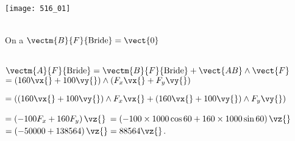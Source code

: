 \normaltrue \difficilefalse \tdifficilefalse
\correctiontrue 


\setcounter{question}{0}%
\ifcorrection
\else
{}
\fi

\ifprof
\else


\begin{marginfigure}
\centering
\texttt{[image: 516\_01]}
\end{marginfigure}
\fi


\ifprof ~\\
On a $\vectm{B}{F}{\text{Bride}} = \vect{0}$
\else
\fi

\ifprof ~\\
$\vectm{A}{F}{\text{Bride}}=\vectm{B}{F}{\text{Bride}} + \vect{AB}\wedge \vect{F} $ 
$=\left(160 \vx{} + 100 \vy{}\right) \wedge \left(F_x \vx{}+F_y \vy{} \right) $

$= \left(\left(160 \vx{} + 100 \vy{}\right) \wedge  F_x \vx{}+ \left(160 \vx{} + 100 \vy{}\right) \wedge F_y \vy{} \right) $

$= \left( -100 F_x +  160  F_y   \right)\vz{} $
$= \left( -100 \times 1000 \cos 60 +  160   \times 1000 \sin 60 \right)\vz{} $
$= \left( - 50000 +  138 564 \right)\vz{} =  88 564 \vz{} $.
\else
\fi


\ifprof
\else


\fi